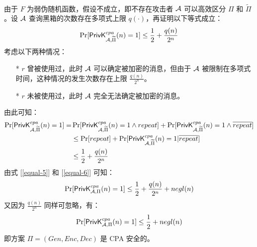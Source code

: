 \begin{questions}
\begin{solution}
\begin{enumerate}
\begin{equation}
\begin{aligned}
                    \end{aligned}
                \end{equation}
                由于 $F$ 为弱伪随机函数，假设不成立，即不存在攻击者 $\mathcal{A}$ 可以高效区分 $\Pi$ 和 $\widetilde{\Pi}$。设 $\mathcal{A}$ 查询黑箱的次数存在多项式上限 $q(\cdot)$，再证明以下等式成立：
                \begin{equation}
                    \label{equal-6}
                    \begin{aligned}
                       \Pr[\mathsf{PrivK}^{cpa}_{\mathcal{A},\widetilde{\Pi}}(n)=1]\leq\frac{1}{2}+\frac{q(n)}{2^n}
                    \end{aligned}
                \end{equation}
                考虑以下两种情况：
                \begin{enumerate}
                    \item[*] $r$ 曾被使用过，此时 $\mathcal{A}$ 可以确定被加密的消息，但由于 $\mathcal{A}$ 被限制在多项式时间，这种情况的发生次数存在上限 $\frac{q(n)}{2^n}$。
                    \item[*] $r$ 未被使用过，此时 $\mathcal{A}$ 完全无法确定被加密的消息。
                \end{enumerate}
                由此可知：
                \begin{equation}
                    \begin{aligned}
                       \Pr[\mathsf{PrivK}^{cpa}_{\mathcal{A},\widetilde{\Pi}}(n)=1]=&\Pr[\mathsf{PrivK}^{cpa}_{\mathcal{A},\widetilde{\Pi}}(n)=1\land{repeat}]+\Pr[\mathsf{PrivK}^{cpa}_{\mathcal{A},\widetilde{\Pi}}(n)=1\land\overline{repeat}]\\
                       &\leq\Pr[repeat]+\Pr[\mathsf{PrivK}^{cpa}_{\mathcal{A},\widetilde{\Pi}}(n)=1|\overline{repeat}]\\
                       &\leq\frac{1}{2}+\frac{q(n)}{2^n}
                    \end{aligned}
                \end{equation}
                由式 [\ref{equal-5}] 和 [\ref{equal-6}] 可知：
                \begin{equation}
                    \begin{aligned}
                       \Pr[\mathsf{PrivK}^{cpa}_{\mathcal{A},\Pi}(n)=1]\leq\frac{1}{2}+\frac{q(n)}{2^n}+negl(n)
                    \end{aligned}
                \end{equation}
                又因为 $\frac{q(n)}{2^n}$ 同样可忽略，有：
                \begin{equation}
                    \begin{aligned}
                       \Pr[\mathsf{PrivK}^{cpa}_{\mathcal{A},\Pi}(n)=1]\leq\frac{1}{2}+negl(n)
                    \end{aligned}
                \end{equation}
                即方案 $\Pi=(Gen,Enc,Dec)$ 是 CPA 安全的。
            \end{enumerate}
        \end{solution}


\end{questions}
